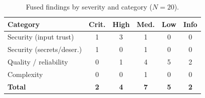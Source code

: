 \begin{table}[!htbp]
  \centering
  \caption{Fused findings by severity and category ($N=20$).}
  \label{tab:severity}
  \renewcommand{\arraystretch}{1.15}
  \small
  \begin{tabular}{@{}lccccc@{}}
    \toprule
    \textbf{Category} & \textbf{Crit.} & \textbf{High} & \textbf{Med.}
      & \textbf{Low} & \textbf{Info} \\
    \midrule
    Security (input trust)   & 1 & 3 & 1 & 0 & 0 \\
    Security (secrets/deser.) & 1 & 0 & 1 & 0 & 0 \\
    Quality / reliability     & 0 & 1 & 4 & 5 & 2 \\
    Complexity                & 0 & 0 & 1 & 0 & 0 \\
    \midrule
    \textbf{Total}            & \textbf{2} & \textbf{4} & \textbf{7}
      & \textbf{5} & \textbf{2} \\
    \bottomrule
  \end{tabular}
\end{table}
